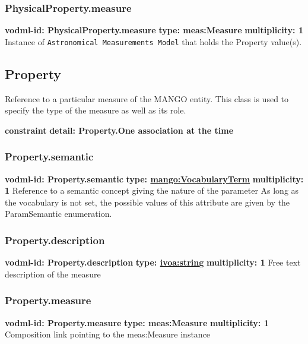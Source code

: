     \subsubsection{PhysicalProperty.measure}
      \textbf{vodml-id: PhysicalProperty.measure} \newline
      \textbf{type: meas:Measure} \newline
      \textbf{multiplicity: 1} \newline 
      Instance of \texttt{Astronomical Measurements Model} that holds the Property value(s).

  \subsection{Property}
  \label{sect:Property}
    Reference to a particular measure of the MANGO entity. This class is used to specify the type of the measure as well as its role.

    \noindent \textbf{constraint} \newline
    \indent    \textbf{detail: Property.One association at the time
 }\newline


    \subsubsection{Property.semantic}
      \textbf{vodml-id: Property.semantic} \newline
      \textbf{type: \hyperref[sect:VocabularyTerm]{mango:VocabularyTerm}} \newline
      \textbf{multiplicity: 1} \newline 
      Reference to a semantic concept giving the nature of the parameter As long as the vocabulary is not set, the possible values of this attribute are given by the ParamSemantic enumeration.

    \subsubsection{Property.description}
      \textbf{vodml-id: Property.description} \newline
      \textbf{type: \hyperref[sect:ivoa]{ivoa:string}} \newline
      \textbf{multiplicity: 1} \newline 
      Free text description of the measure

    \subsubsection{Property.measure}
      \textbf{vodml-id: Property.measure} \newline
      \textbf{type: meas:Measure} \newline
      \textbf{multiplicity: 1} \newline 
      Composition link pointing to the meas:Measure instance

